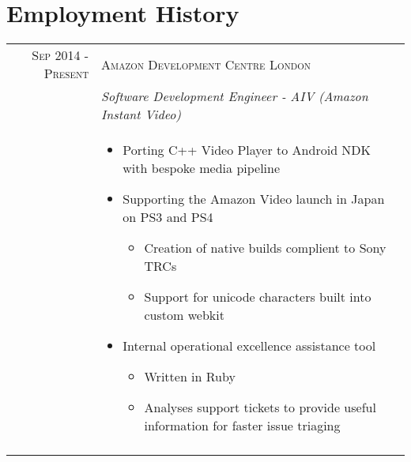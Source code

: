 \section*{Employment History}

\begin{tabular}{r|p{11cm}}

\textsc{Sep 2014 - Present} & \textsc{Amazon Development Centre London}\\ 
& \emph{Software Development Engineer - AIV (Amazon Instant Video)}\\
& \begin{footnotesize}
\begin{itemize}
	\vspace*{-\baselineskip}
	\item Porting C++ Video Player to Android NDK with bespoke media pipeline
	\item Supporting the Amazon Video launch in Japan on PS3 and PS4
		\begin{itemize}
		\item Creation of native builds complient to Sony TRCs
		\item Support for unicode characters built into custom webkit
		\end{itemize}
	\item Internal operational excellence assistance tool
		\begin{itemize}
		\item Written in Ruby
		\item Analyses support tickets to provide useful information for faster issue triaging
		\end{itemize}
	\vspace*{-\baselineskip}
\end{itemize}
\end{footnotesize}\\

\multicolumn{2}{c}{} \\


\end{tabular}
